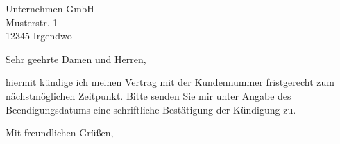 \documentclass[
    absender,
    paper=a4,
    version=last,
    fontsize=11pt,
    DIV=13,
    BCOR=0mm]{scrlttr2}
\begin{document}
\makeatletter{}\makeatother




\begin{letter}{
    Unternehmen GmbH\\
    Musterstr. 1\\
    12345 Irgendwo
}
\opening{Sehr geehrte Damen und Herren,}

hiermit kündige ich meinen Vertrag mit der Kundennummer \customer{} fristgerecht zum nächstmöglichen Zeitpunkt.
Bitte senden Sie mir unter Angabe des Beendigungsdatums eine schriftliche Bestätigung der Kündigung zu.

\closing{Mit freundlichen Grüßen,}
\end{letter}
\end{document}
